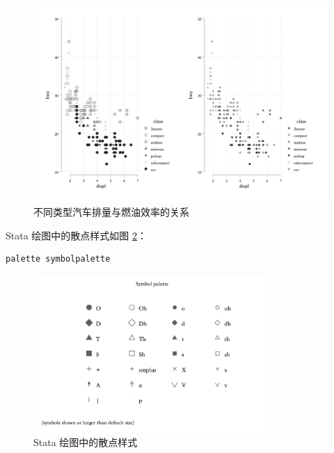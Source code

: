 \documentclass[]{ctexbook}
\begin{document}
\begin{figure}

{\centering \includegraphics[width=1\textwidth]{assets/hwydispl6} 

}

\caption{不同类型汽车排量与燃油效率的关系}\label{fig:hwydispl6}
\end{figure}

Stata 绘图中的散点样式如图 \ref{fig:symbolpalette}：

\begin{lstlisting}
palette symbolpalette
\end{lstlisting}

\begin{figure}

{\centering \includegraphics[width=0.8\textwidth]{assets/symbolpalette} 

}

\caption{Stata 绘图中的散点样式}\label{fig:symbolpalette}
\end{figure}
\end{document}
